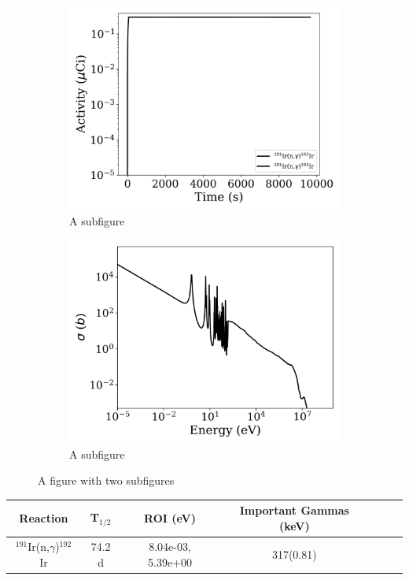 \begin{figure}[h]
\centering
\begin{subfigure}{.5\textwidth}
  \centering
     \includegraphics[width=.8\textwidth]{plot/Ir-191(n,gamma)Ir-192_library1} 

  \caption{A subfigure}
  \label{fig:sub1}
\end{subfigure}%
\begin{subfigure}{.5\textwidth}
  \centering
     \includegraphics[width=.8\textwidth]{plot/Ir-191(n,gamma)Ir-192} 

  \caption{A subfigure}
  \label{fig:sub2}
\end{subfigure}
\caption{A figure with two subfigures}
\label{fig:test}
\end{figure}

\begin{table}[h]
\centering
\begin{tabular}{ |c|c|c|c|c|c|c| }
 \hline
 Reaction & T$_{1/2}$ & ROI (eV) & Important Gammas (keV) \\
 \hline 
 $^{191}$Ir(n,$\gamma$)$^{192}$Ir & 74.2 d & 8.04e-03, 5.39e+00 & 317(0.81) \\ 
\hline
\end{tabular}
\end{table}
